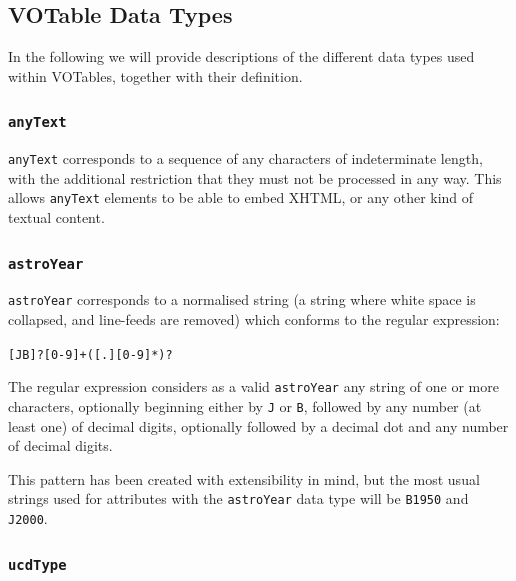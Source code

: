 \subsection{VOTable Data Types} %
\label{sub:votable_data_types}

In the following we will provide descriptions of the different
data types used within VOTables, together with their definition.

\subsubsection{\texttt{anyText}} %
\label{ssub:anytext}

\texttt{anyText} corresponds to a sequence of any characters of
indeterminate length, with the additional restriction that they must not
be processed in any way. This allows \texttt{anyText} elements to
be able to embed XHTML, or any other kind of textual content.


\subsubsection{\texttt{astroYear}} %
\label{ssub:astroyear}

\texttt{astroYear} corresponds to a normalised string (a string
where white space is collapsed, and line-feeds are removed) which
conforms to the regular expression:

\begin{center}
	\texttt{[JB]?[0-9]+([.][0-9]*)?}
\end{center}

The regular expression considers as a valid \texttt{astroYear} any
string of one or more characters, optionally beginning either by
\texttt{J} or \texttt{B}, followed by any number (at least one) of
decimal digits, optionally followed by a decimal dot and any number of
decimal digits.

This pattern has been created with extensibility in mind, but the
most usual strings used for attributes with the \texttt{astroYear}
data type will be \texttt{B1950} and \texttt{J2000}.


\subsubsection{\texttt{ucdType}} %
\label{ssub:ucdtype}

